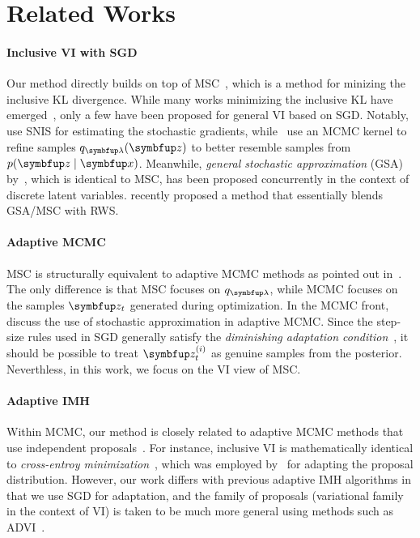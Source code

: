 
\section{Related Works}
\paragraph{Inclusive VI with SGD}
Our method directly builds on top of MSC~\citep{NEURIPS2020_b2070693}, which is a method for minizing the inclusive KL divergence.
While many works minimizing the inclusive KL have emerged~\citep{DBLP:journals/corr/BornscheinB14, li_approximate_2017, 10.5555/2074022.2074067, pmlr-v124-ou20a, kim2021adaptive}, only a few have been proposed for general VI based on SGD.
Notably,~\citet{DBLP:journals/corr/BornscheinB14} use SNIS for estimating the stochastic gradients, while~\citet{li_approximate_2017} use an MCMC kernel to refine samples \(q_{\vlambda}(\vz)\) to better resemble samples from \(p(\vz\mid\vx)\).
Meanwhile, \textit{general stochastic approximation} (GSA) by~\citet[Algorithm 1]{pmlr-v124-ou20a}, which is identical to MSC, has been proposed concurrently in the context of discrete latent variables.
\citet{kim2021adaptive} recently proposed a method that essentially blends GSA/MSC with RWS.

\paragraph{Adaptive MCMC}
MSC is structurally equivalent to adaptive MCMC methods as pointed out in~\cite{pmlr-v124-ou20a}.
The only difference is that MSC focuses on \(q_{\vlambda}\), while MCMC focuses on the samples \(\vz_t\) generated during optimization.
In the MCMC front, \citet{10.1007/s11222-008-9110-y, garthwaite_adaptive_2016} discuss the use of stochastic approximation in adaptive MCMC.
Since the step-size rules used in SGD generally satisfy the \textit{diminishing adaptation condition}~\cite{10.1007/s11222-008-9110-y}, it should be possible to treat \(\vz^{(i)}_t\) as genuine samples from the posterior.
Neverthless, in this work, we focus on the VI view of MSC.

\paragraph{Adaptive IMH}
Within MCMC, our method is closely related to adaptive MCMC methods that use independent proposals~\citep{andrieu_ergodicity_2006, keith_adaptive_2008, holden_adaptive_2009, giordani_adaptive_2010}.
For instance, inclusive VI is mathematically identical to \textit{cross-entroy minimization}~\citet{barbakh_cross_2009}, which was employed by~\citet{keith_adaptive_2008} for adapting the proposal distribution.
However, our work differs with previous adaptive IMH algorithms in that we use SGD for adaptation, and the family of proposals (variational family in the context of VI) is taken to be much more general using methods such as ADVI~\citep{JMLR:v18:16-107}.

